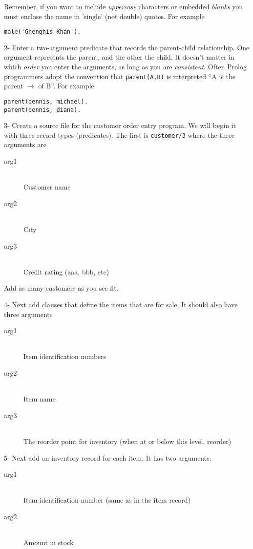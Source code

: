 Remember, if you want to include \emph{uppercase} characters or embedded
\emph{blanks} you must enclose the name in 'single' (not double) quotes. For
example
\begin{verbatim}
male('Ghenghis Khan').
\end{verbatim}

2- Enter a two-argument predicate that records the parent-child relationship.
One argument represents the parent, and the other the child. It doesn't matter
in which \emph{order} you enter the arguments, as long as you are
\emph{consistent}. Often Prolog programmers adopt the convention that
\verb'parent(A,B)' is interpreted ``A is the parent $\rightarrow$ of B''. For
example
\begin{verbatim}
parent(dennis, michael).
parent(dennis, diana).
\end{verbatim}


3- Create a source file for the customer order entry program. We will begin it
with three record types (predicates). The first is \verb'customer/3' where the
three arguments are
\begin{description}
\item[arg1]\ \\Customer name
\item[arg2]\ \\City
\item[arg3]\ \\Credit rating (aaa, bbb, etc)
\end{description}
Add as many customers as you see fit.

4- Next add clauses that define the items that are for sale. It should also have
three arguments
\begin{description}
\item[arg1]\ \\Item identification numbers
\item[arg2]\ \\Item name
\item[arg3]\ \\The reorder point for inventory (when at or below this level,
reorder)
\end{description}

5- Next add an inventory record for each item. It has two arguments.
\begin{description}
\item[arg1]\ \\Item identification number (same as in the item record)
\item[arg2]\ \\Amount in stock
\end{description}

\secup